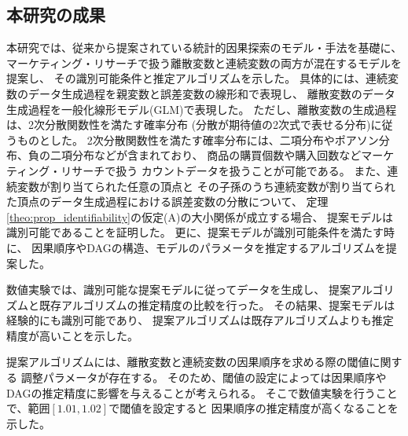 
\subsection{本研究の成果}

本研究では、従来から提案されている統計的因果探索のモデル・手法を基礎に、
マーケティング・リサーチで扱う離散変数と連続変数の両方が混在するモデルを提案し、
その識別可能条件と推定アルゴリズムを示した。
具体的には、連続変数のデータ生成過程を親変数と誤差変数の線形和で表現し、
離散変数のデータ生成過程を一般化線形モデル(GLM)で表現した。
ただし、離散変数の生成過程は、2次分散関数性を満たす確率分布
(分散が期待値の2次式で表せる分布)に従うものとした。
2次分散関数性を満たす確率分布には、二項分布やポアソン分布、負の二項分布などが含まれており、
商品の購買個数や購入回数などマーケティング・リサーチで扱う
カウントデータを扱うことが可能である。
また、連続変数が割り当てられた任意の頂点と
その子孫のうち連続変数が割り当てられた頂点のデータ生成過程における誤差変数の分散について、
定理\ref{theo:prop_identifiability}の仮定(A)の大小関係が成立する場合、
提案モデルは識別可能であることを証明した。
更に、提案モデルが識別可能条件を満たす時に、
因果順序やDAGの構造、モデルのパラメータを推定するアルゴリズムを提案した。

数値実験では、識別可能な提案モデルに従ってデータを生成し、
提案アルゴリズムと既存アルゴリズムの推定精度の比較を行った。
その結果、提案モデルは経験的にも識別可能であり、
提案アルゴリズムは既存アルゴリズムよりも推定精度が高いことを示した。

提案アルゴリズムには、離散変数と連続変数の因果順序を求める際の閾値に関する
調整パラメータが存在する。
そのため、閾値の設定によっては因果順序やDAGの推定精度に影響を与えることが考えられる。
そこで数値実験を行うことで、範囲$[1.01, 1.02]$で閾値を設定すると
因果順序の推定精度が高くなることを示した。
